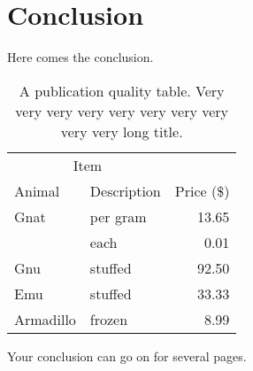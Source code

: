\chapter{Conclusion}
Here comes the conclusion.
\begin{table}[tbph]
\centering
\caption{A publication quality table. Very very very very very very very very very very long title.
\label{table:food1}}
\begin{tabular}{@{}llr@{}} \toprule 
\multicolumn{2}{c}{Item} \\ \cmidrule(r){1-2} 
Animal & Description & Price (\$)\\ \midrule 
Gnat & per gram & 13.65 \\ 
& each & 0.01 \\ 
Gnu & stuffed & 92.50 \\ 
Emu & stuffed & 33.33 \\ 
Armadillo & frozen & 8.99 \\ \bottomrule 
\end{tabular}
\end{table}

\newpage
Your conclusion can go on for several pages.
